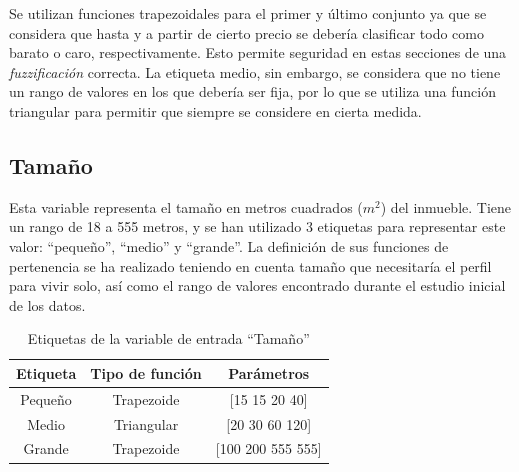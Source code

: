 \documentclass[12pt]{report} %
\begin{document}
        Se utilizan funciones trapezoidales para el primer y último conjunto ya que se considera que hasta y a partir de 
        cierto precio se debería clasificar todo como barato o caro, respectivamente. Esto permite seguridad en 
        estas secciones de una \textit{fuzzificación} correcta. La etiqueta medio, sin embargo, se considera que no tiene
        un rango de valores en los que debería ser fija, por lo que se utiliza una función triangular para permitir que 
        siempre se considere en cierta medida. 

        \subsection{Tamaño}
        Esta variable representa el tamaño en metros cuadrados ($m^2$) del inmueble.
        Tiene un rango de 18 a 555 metros, y se han utilizado 3 etiquetas para representar este valor: ``pequeño'', ``medio'' y ``grande''.
        La definición de sus funciones de pertenencia se ha realizado teniendo en cuenta tamaño que necesitaría el perfil para vivir solo,
         así como el rango de valores encontrado durante el estudio inicial de los datos.

        \begin{table}[h]
            \center
            \begin{tabular}{@{}ccc@{}}
                \toprule
                \textbf{Etiqueta} & \textbf{Tipo de función} & \textbf{Parámetros} \\
                \midrule
                Pequeño & Trapezoide & [15 15 20 40]     \\
                Medio   & Triangular & [20 30 60 120]    \\
                Grande  & Trapezoide & [100 200 555 555] \\
                \bottomrule
            \end{tabular}
            \caption{Etiquetas de la variable de entrada ``Tamaño''}
        \end{table}
\end{document}
